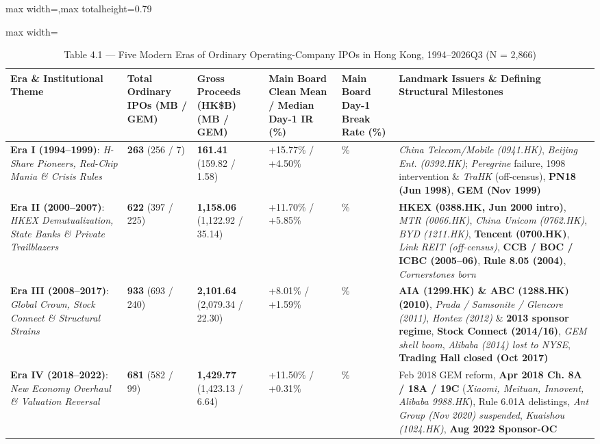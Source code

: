 \documentclass[11pt,letterpaper]{article}
\begin{document}
\begin{table}[!htbp]
\centering
\caption*{Table 4.1 — Five Modern Eras of Ordinary Operating-Company IPOs in Hong Kong, 1994–2026Q3 (N = 2,866)}
\begin{adjustbox}{max width=\textwidth,max totalheight=0.79\textheight}
\begin{minipage}{\textwidth}\centering
\footnotesize
\setlength{\tabcolsep}{3.5pt}
\renewcommand{\arraystretch}{1.18}
\begin{adjustbox}{max width=\textwidth}
\begin{tabular}{>{\raggedright\arraybackslash}p{3.62cm}>{\centering\arraybackslash}p{1.93cm}>{\centering\arraybackslash}p{2.12cm}>{\centering\arraybackslash}p{2.76cm}>{\centering\arraybackslash}p{1.99cm}>{\raggedright\arraybackslash}p{3.39cm}}
\toprule
Era \& Institutional Theme & Total Ordinary IPOs (MB / GEM) & Gross Proceeds (HK\$B) (MB / GEM) & Main Board Clean Mean / Median Day-1 IR (\%) & Main Board Day-1 Break Rate (\%) & Landmark Issuers \& Defining Structural Milestones \\
\midrule
\textbf{Era I (1994–1999)}: \textit{H-Share Pioneers, Red-Chip Mania \& Crisis Rules} & \textbf{263} (256 / 7) & \textbf{161.41} (159.82 / 1.58) & +15.77\% / +4.50\% & 32.6\% & \textit{China Telecom/Mobile (0941.HK)}, \textit{Beijing Ent. (0392.HK)}; \textit{Peregrine} failure, 1998 intervention \& \textit{TraHK} (off-census), \textbf{PN18 (Jun 1998)}, \textbf{GEM (Nov 1999)} \\
\textbf{Era II (2000–2007)}: \textit{HKEX Demutualization, State Banks \& Private Trailblazers} & \textbf{622} (397 / 225) & \textbf{1,158.06} (1,122.92 / 35.14) & +11.70\% / +5.85\% & 24.9\% & \textbf{HKEX (0388.HK, Jun 2000 intro)}, \textit{MTR (0066.HK)}, \textit{China Unicom (0762.HK)}, \textit{BYD (1211.HK)}, \textbf{Tencent (0700.HK)}, \textit{Link REIT (off-census)}, \textbf{CCB / BOC / ICBC (2005–06)}, \textbf{Rule 8.05 (2004)}, \textit{Cornerstones born} \\
\textbf{Era III (2008–2017)}: \textit{Global Crown, Stock Connect \& Structural Strains} & \textbf{933} (693 / 240) & \textbf{2,101.64} (2,079.34 / 22.30) & +8.01\% / +1.59\% & 38.2\% & \textbf{AIA (1299.HK) \& ABC (1288.HK) (2010)}, \textit{Prada / Samsonite / Glencore (2011)}, \textit{Hontex (2012)} \& \textbf{2013 sponsor regime}, \textbf{Stock Connect (2014/16)}, \textit{GEM shell boom}, \textit{Alibaba (2014) lost to NYSE}, \textbf{Trading Hall closed (Oct 2017)} \\
\textbf{Era IV (2018–2022)}: \textit{New Economy Overhaul \& Valuation Reversal} & \textbf{681} (582 / 99) & \textbf{1,429.77} (1,423.13 / 6.64) & +11.50\% / +0.31\% & 40.9\% & Feb 2018 GEM reform, \textbf{Apr 2018 Ch. 8A / 18A / 19C} (\textit{Xiaomi, Meituan, Innovent, Alibaba 9988.HK}), Rule 6.01A delistings, \textit{Ant Group (Nov 2020) suspended}, \textit{Kuaishou (1024.HK)}, \textbf{Aug 2022 Sponsor-OC} \\

\end{tabular}
\end{adjustbox}
\end{minipage}
\end{adjustbox}
\end{table}
\end{document}

